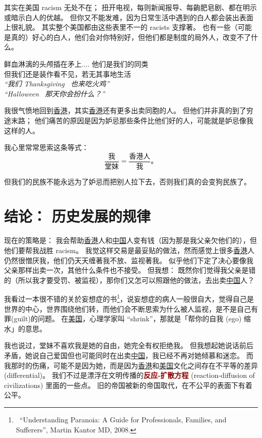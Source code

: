 \documentclass[12pt]{report}
\newcommand{\tab}{\hspace*{1cm}}
\newcommand{\speechCn}[1]{\textrm{\textit{\textcolor{Speech}{#1}}}}
\renewcommand{\em}[1]{\textbf{\textcolor{DarkRed}{#1}}}
\begin{document}
{其实在美国 racism 无处不在； 扭开电视，每则新闻报导、每齣肥皂剧、都在明示或暗示白人的优越。 但你又不能发难，因为日常生活中遇到的白人都会装出表面上很礼貌。 其实整个美国都由这些表里不一的 racists 支撑著。 也有一些（可能是真的）好心的白人，他们会对你特别好，但他们都是制度的局外人，改变不了什么。

\tab 鲜血淋漓的头颅插在矛上.... 他们是我们的同类 \\
\tab 但我们还是装作看不见，若无其事地生活 \\
\tab \speechCn{``我们 Thanksgiving \ 也来吃火鸡''} \\
\tab \speechCn{``Halloween \ 那天你会扮什么？''}

我很气愤地回到\uline{香港}，其实\uline{香港}还有更多出卖同胞的人。%
但他们并非真的到了穷途末路； 他们痛苦的原因是因为妒忌那些条件比他们好的人，可能就是妒忌像我这样的人。

我心里常常思索这条等式：
$$ \frac{\mbox{我}}{\mbox{堂妹}} = \frac{\mbox{香港人}}{\mbox{我}} \mbox{。}$$

但我们的民族不能永远为了妒忌而把别人拉下去，否则我们真的会变狗民族了。

\chapter{结论： 历史发展的规律}

现在的策略是： 我会帮助\uline{香港}人和\uline{中国}人变有钱（因为那是我父亲欠他们的），但他们要帮我战胜 racism。 我觉这样交易是最妥贴的做法，然而感觉上很多\uline{香港}人仍然很憎厌我，他们仍天天缠著我不放、监视著我。 似乎他们下定了决心要像我父亲那样出卖一次，其他什么条件也不接受。 但我想： 既然你们觉得我父亲是错的（所以我才要受罚、被监视），那你们又怎可以照跟他的做法，去出卖\uline{中国}人？

我看过一本很不错的关於妄想症的书\footnote{\ ``Understanding Paranoia: A Guide for Professionals, Families, and Sufferers'', Martin Kantor MD, 2008.}，说妄想症的病人一般很自大，觉得自己是世界的中心，世界围绕他们转，而他们会不断思索为什么被人监视，是不是自己有罪(guilt)的问题。 在\uline{美国}，心理学家叫 ``shrink''，那就是「帮你的自我 (ego) 缩水」的意思。

我也说过，堂妹不喜欢我是她的自由，她完全有权拒绝我。 但我想起她说话前后矛盾，她说自己爱国但也可能同时在出卖\uline{中国}，我已经不再对她倾慕和迷恋。 而我那时的伤痛，可能不是因为她，而是因为\uline{香港}和\uline{美国}文化之间存在不平等的差异 (differential)。 我们不过是漂浮在文明传播的\em{反应-扩散方程} (reaction-diffusion of civilizations) 里面的一些点。 旧的帝国被新的帝国取代，在不公平的表面下有着公平。

}
\end{document}
